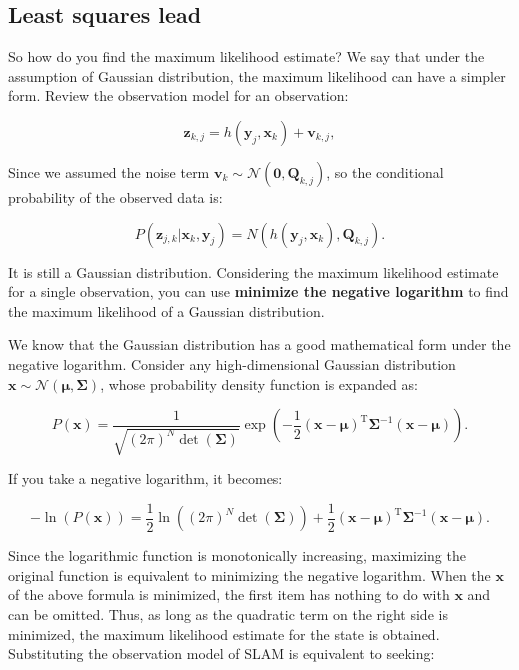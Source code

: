 \subsection{Least squares lead}

So how do you find the maximum likelihood estimate? We say that under the assumption of Gaussian distribution, the maximum likelihood can have a simpler form. Review the observation model for an observation:

\[
{\bm{z}_{k,j}} = h\left( {{ \bm{y}_j},{ \bm{x}_k}} \right)+ \bm{v}_{k, j},
\]

Since we assumed the noise term ${\bm{v}_k} \sim \mathcal{N}\left( {\bm{0},{{{\bm{Q}}}_{k,j}}} \right)$, so the conditional probability of the observed data is:

\[
P( \bm{z}_{j,k} | \bm{x}_k, \bm{y}_j ) = N\left( h(\bm{y}_j, \bm{x}_k), \bm{Q}_{k,j} \right).
\]

It is still a Gaussian distribution. Considering the maximum likelihood estimate for a single observation, you can use \textbf{minimize the negative logarithm} to find the maximum likelihood of a Gaussian distribution.

We know that the Gaussian distribution has a good mathematical form under the negative logarithm. Consider any high-dimensional Gaussian distribution $\bm{x} \sim \mathcal{N}(\bm{\mu}, \bm{\Sigma})$, whose probability density function is expanded as:

\begin{equation}
P\left( \bm{x} \right) = \frac{1}{{\sqrt {{{(2\pi )}^N}\det ( \bm{\Sigma} )} }}\exp \left( { - \frac{1}{2}{{\left( { \bm{x} - \bm{\mu} } \right)}^\mathrm{T}}{ \bm{\Sigma} ^{ - 1}}\left( { \bm{x} - \bm{\mu} } \right)} \right).
\end{equation}

If you take a negative logarithm, it becomes:

\begin{equation}
- \ln \left( {P\left( \bm{x} \right)} \right) = \frac{1}{2}\ln \left( {{{\left( {2\pi } \right )}^N}\det \left( \bm{\Sigma} \right)} \right) + \frac{1}{2}{\left( { \bm{x} - \bm{\mu} } \right)^\mathrm{T}}{\bm{\Sigma} ^{ - 1}}\left( {\bm{x} - \bm{\mu} } \right).
\end{equation}

Since the logarithmic function is monotonically increasing, maximizing the original function is equivalent to minimizing the negative logarithm. When the $\bm{x}$ of the above formula is minimized, the first item has nothing to do with $\bm{x}$ and can be omitted. Thus, as long as the quadratic term on the right side is minimized, the maximum likelihood estimate for the state is obtained. Substituting the observation model of SLAM is equivalent to seeking:

